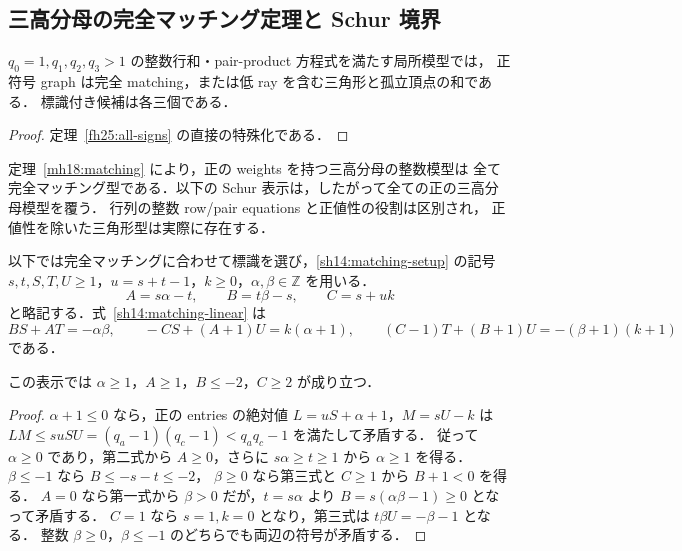 
\subsection{三高分母の完全マッチング定理と Schur 境界}
\label{sm14:section}

\begin{proposition}[正値性を仮定しない三高分母の全符号型]
\label{sm14:four-sign-types}
$q_0=1,q_1,q_2,q_3>1$ の整数行和・pair-product 方程式を満たす局所模型では，
正符号 graph は完全 matching，または低 ray を含む三角形と孤立頂点の和である．
標識付き候補は各三個である．
\end{proposition}
\begin{proof}
定理~\ref{fh25:all-signs} の直接の特殊化である．
\end{proof}



定理~\ref{mh18:matching} により，正の weights を持つ三高分母の整数模型は
全て完全マッチング型である．以下の Schur 表示は，したがって全ての正の三高分母模型を覆う．
行列の整数 row/pair equations と正値性の役割は区別され，
正値性を除いた三角形型は実際に存在する．

以下では完全マッチングに合わせて標識を選び，\ref{sh14:matching-setup} の記号
$s,t,S,T,U\geq1$，$u=s+t-1$，$k\geq0$，$\alpha,\beta\in\mathbb Z$ を用いる．
\[
 A=s\alpha-t,\qquad B=t\beta-s,\qquad C=s+uk
\]
と略記する．式~\eqref{sh14:matching-linear} は
\begin{equation}\label{sm14:linear}
 BS+AT=-\alpha\beta,\qquad
 -CS+(A+1)U=k(\alpha+1),\qquad
 (C-1)T+(B+1)U=-(\beta+1)(k+1)
\end{equation}
である．

\begin{lemma}
\label{sm14:basic-bounds}
この表示では $\alpha\geq1$，$A\geq1$，$B\leq-2$，$C\geq2$ が成り立つ．
\end{lemma}

\begin{proof}
$\alpha+1\leq0$ なら，正の entries の絶対値 $L=uS+\alpha+1$，$M=sU-k$ は
$LM\leq suSU=(q_a-1)(q_c-1)<q_aq_c-1$ を満たして矛盾する．
従って $\alpha\geq0$ であり，第二式から $A\geq0$，さらに $s\alpha\geq t\geq1$ から
$\alpha\geq1$ を得る．$\beta\leq-1$ なら $B\leq-s-t\leq-2$，
$\beta\geq0$ なら第三式と $C\geq1$ から $B+1<0$ を得る．
$A=0$ なら第一式から $\beta>0$ だが，$t=s\alpha$ より
$B=s(\alpha\beta-1)\geq0$ となって矛盾する．
$C=1$ なら $s=1,k=0$ となり，第三式は $t\beta U=-\beta-1$ となる．
整数 $\beta\geq0$，$\beta\leq-1$ のどちらでも両辺の符号が矛盾する．
\end{proof}

